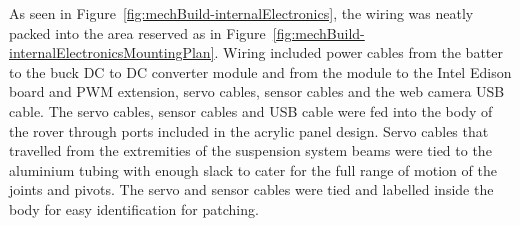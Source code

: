         As seen in Figure~\ref{fig:mechBuild-internalElectronics}, the wiring was neatly packed into the area reserved as in Figure~\ref{fig:mechBuild-internalElectronicsMountingPlan}. Wiring included power cables from the batter to the buck DC to DC converter module and from the module to the Intel Edison board and PWM extension, servo cables, sensor cables and the web camera USB cable. The servo cables, sensor cables and USB cable were fed into the body of the rover through ports included in the acrylic panel design. Servo cables that travelled from the extremities of the suspension system beams were tied to the aluminium tubing with enough slack to cater for the full range of motion of the joints and pivots. The servo and sensor cables were tied and labelled inside the body for easy identification for patching.